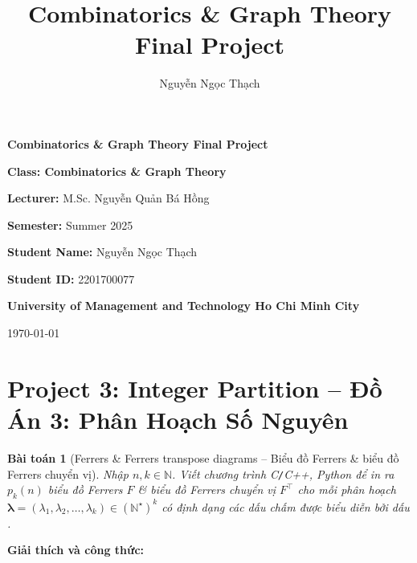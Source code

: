 \documentclass{article}
\title{Combinatorics & Graph Theory Final Project}
\author{Nguyễn Ngọc Thạch}
\date{}
\newtheorem{baitoan}{Bài toán}
\begin{document}
\begin{titlepage}
    \centering
    \vspace*{2cm}
    \LARGE\textbf{Combinatorics \& Graph Theory Final Project}
    \vspace{1.5cm}

    \large\textbf{Class: Combinatorics \& Graph Theory}

    \vspace{0.5cm}

    \textbf{Lecturer:} M.Sc. Nguyễn Quản Bá Hồng

    \vspace{0.5cm}

    \textbf{Semester:} Summer 2025
    
    \vspace{1.5cm}

    \textbf{Student Name:} Nguyễn Ngọc Thạch

    \vspace{0.5cm}

    \textbf{Student ID:} 2201700077

    \vspace{1.5cm}

    \textbf{University of Management and Technology Ho Chi Minh City}

    \vfill

    \large\today
\end{titlepage}

\newpage

\section{Project 3: Integer Partition -- Đồ Án 3: Phân Hoạch Số Nguyên}

\begin{baitoan}[Ferrers \& Ferrers transpose diagrams -- Biểu đồ Ferrers \& biểu đồ Ferrers chuyển vị]
    Nhập $n,k\in\mathbb{N}$. Viết chương trình {\sf C{\tt/}C++, Python} để in ra $p_k(n)$ biểu đồ Ferrers $F$ \& biểu đồ Ferrers chuyển vị $F^\top$ cho mỗi phân hoạch $\boldsymbol{\lambda} = (\lambda_1,\lambda_2,\ldots,\lambda_k)\in(\mathbb{N}^\star)^k$ có định dạng các dấu chấm được biểu diễn bởi dấu {\tt*}.
\end{baitoan}


\textbf{Giải thích và công thức:}
\end{document}
